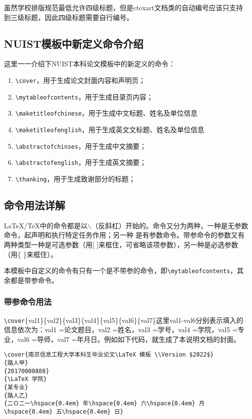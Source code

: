 虽然学校排版规范最低允许四级标题，但是ctexart文档类的自动编号应该只支持到三级标题，因此四级标题需要自行编号。

\subsection{NUIST模板中新定义命令介绍}

这里一一介绍下NUIST本科论文模板中的新定义的命令：

{
\color{blue}
\begin{enumerate}
    \item \verb|\cover|，用于生成论文封面内容和声明页；
    \item \verb|\mytableofcontents|，用于生成目录页内容；
    \item \verb|\maketitleofchinese|，用于生成中文标题、姓名及单位信息
    \item \verb|\maketitleofenglish|，用于生成英文文标题、姓名及单位信息
    \item \verb|\abstractofchinses|，用于生成中文摘要；
    \item \verb|\abstractofenglish|，用于生成英文摘要；
    \item \verb|\thanking|，用于生成致谢部分的标题；
\end{enumerate}
}

\subsection{命令用法详解}

\LaTeX/\TeX 中的命令都是以$\backslash$（反斜杠）开始的。命令又分为两种，一种是无参数命令，起声明和执行特定任务作用；另一种 是有参数命令。带参命令的参数又有两种类型一种是可选参数（用[ ]来框住，可省略该项参数），另一种是必选参数（用\{ \}来框住）。

本模板中自定义的命令有只有一个是不带参的命令，即\verb|\mytableofcontents|，其余都是带参命令。

\subsubsection{带参命令用法}

\verb|\cover|\{val1\}\{val2\}\{val3\}\{val4\}\{val5\}\{val6\}\{val7\}这里val1-val6分别表示填入的信息依次为：val1 =论文题目，val2 =姓名，val3 =学号，val4 =学院，val5 =专业，val6 =导师，val7 =年月日。例如如下代码，就生成了本说明文档的封面。

{
\color{green!50!black}
\begin{lstlisting}[breaklines=true,]
\cover{南京信息工程大学本科生毕业论文\LaTeX 模板 \\Version $2022$}
{路人甲}
{20170000888}
{\LaTeX 学院}
{某专业}
{路人乙}
{二Ｏ二一\hspace{0.4em} 年\hspace{0.4em} 六\hspace{0.4em} 月\hspace{0.4em} 五\hspace{0.4em} 日}
\end{lstlisting}
}


